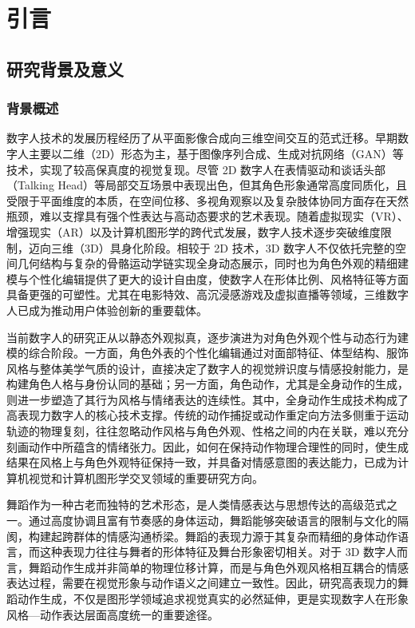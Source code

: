 
\chapter{引言}

\section{研究背景及意义}
\subsection{背景概述}
数字人技术的发展历程经历了从平面影像合成向三维空间交互的范式迁移。早期数字人主要以二维（2D）形态为主，基于图像序列合成、生成对抗网络（GAN）\cite{goodfellow2020generative}等技术，实现了较高保真度的视觉复现。尽管 2D 数字人在表情驱动和谈话头部（Talking Head）等局部交互场景中表现出色，但其角色形象通常高度同质化，且受限于平面维度的本质，在空间位移、多视角观察以及复杂肢体协同方面存在天然瓶颈，难以支撑具有强个性表达与高动态要求的艺术表现。随着虚拟现实（VR）、增强现实（AR）以及计算机图形学的跨代式发展，数字人技术逐步突破维度限制，迈向三维（3D）具身化阶段。相较于 2D 技术，3D 数字人不仅依托完整的空间几何结构与复杂的骨骼运动学链实现全身动态展示，同时也为角色外观的精细建模与个性化编辑提供了更大的设计自由度，使数字人在形体比例、风格特征等方面具备更强的可塑性。尤其在电影特效、高沉浸感游戏及虚拟直播等领域，三维数字人已成为推动用户体验创新的重要载体。

当前数字人的研究正从以静态外观拟真，逐步演进为对角色外观个性与动态行为建模的综合阶段。一方面，角色外表的个性化编辑通过对面部特征、体型结构、服饰风格与整体美学气质的设计，直接决定了数字人的视觉辨识度与情感投射能力，是构建角色人格与身份认同的基础；另一方面，角色动作，尤其是全身动作的生成，则进一步塑造了其行为风格与情绪表达的连续性。其中，全身动作生成技术构成了高表现力数字人的核心技术支撑。传统的动作捕捉或动作重定向方法多侧重于运动轨迹的物理复刻，往往忽略动作风格与角色外观、性格之间的内在关联，难以充分刻画动作中所蕴含的情绪张力。因此，如何在保持动作物理合理性的同时，使生成结果在风格上与角色外观特征保持一致，并具备对情感意图的表达能力，已成为计算机视觉和计算机图形学交叉领域的重要研究方向。

舞蹈作为一种古老而独特的艺术形态，是人类情感表达与思想传达的高级范式之一。通过高度协调且富有节奏感的身体运动，舞蹈能够突破语言的限制与文化的隔阂，构建起跨群体的情感沟通桥梁。舞蹈的表现力源于其复杂而精细的身体动作语言，而这种表现力往往与舞者的形体特征及舞台形象密切相关。对于 3D 数字人而言，舞蹈动作生成并非简单的物理位移计算，而是与角色外观风格相互耦合的情感表达过程，需要在视觉形象与动作语义之间建立一致性。因此，研究高表现力的舞蹈动作生成，不仅是图形学领域追求视觉真实的必然延伸，更是实现数字人在形象风格—动作表达层面高度统一的重要途径。

